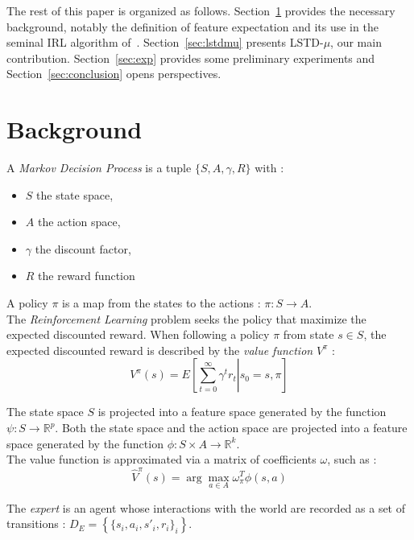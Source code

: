 \documentclass{article}
\begin{document}
The rest of this paper is organized as follows.
Section~\ref{sec:back} provides the necessary background,
notably the definition of feature expectation and its use in the
seminal IRL algorithm of~\citep{abbeel2004apprenticeship}.
Section~\ref{sec:lstdmu} presents LSTD-$\mu$, our main contribution.
Section~\ref{sec:exp} provides some preliminary experiments and
Section~\ref{sec:conclusion} opens perspectives.

\section{Background}
\label{sec:back}
A \emph{Markov Decision Process} is a tuple $\{S,A,\gamma,R\}$ with :
\begin{itemize}
\item $S$ the state space,
\item $A$ the action space,
\item $\gamma$ the discount factor,
\item $R$ the reward function
\end{itemize}

A policy $\pi$ is a map from the states to the actions : $\pi:S\rightarrow A$.\\

The \emph{Reinforcement Learning} problem seeks the policy that maximize the expected discounted reward. When following a policy $\pi$ from state $s\in S$, the expected discounted reward is described by the \emph{value function} $V^\pi$ : \\
\begin{equation}
V^\pi(s) = E\left[\left.\sum\limits_{t=0}^{\infty}\gamma^tr_t\right|s_0=s,\pi\right]
\label{eqn:V}
\end{equation}

The state space $S$ is projected into a feature space generated by the function $\psi : S \rightarrow \mathbb{R}^p$. Both the state space and the action space are projected into a feature space generated by the function $\phi : S\times A \rightarrow \mathbb{R}^k$.\\

The value function is approximated via a matrix of coefficients $\omega$, such as :
\begin{equation}
\hat V^\pi(s) = \arg\max_{a\in A}\omega_\pi^T\phi(s,a)
\end{equation}

The \emph{expert} is an agent whose interactions with the world are recorded as a set of transitions : $D_E = \left\{\{s_i,a_i,s'_i,r_i\}_i\right\}$.\\
\end{document}
